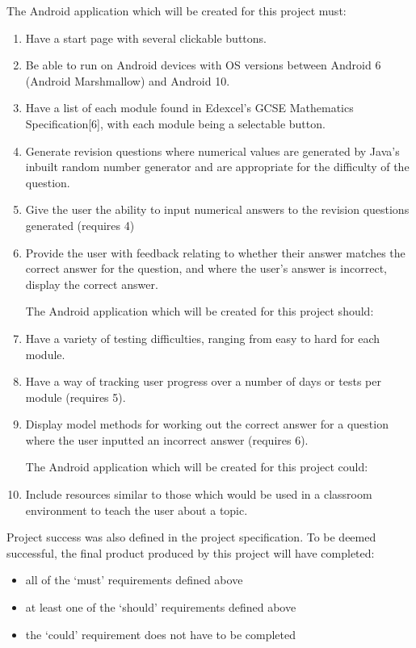 \documentclass{article}
\begin{document}
The Android application which will be created for this project must: 

\begin{enumerate}
	\item Have a start page with several clickable buttons.
	\item Be able to run on Android devices with OS versions between Android 6 (Android Marshmallow) and Android 10.
	\item Have a list of each module found in Edexcel's GCSE Mathematics Specification[6], with each module being a selectable button.
	\item Generate revision questions where numerical values are generated by Java's inbuilt random number generator and are appropriate for the difficulty of the question.
	\item Give the user the ability to input numerical answers to the revision questions generated (requires 4)
	\item Provide the user with feedback relating to whether their answer matches the correct answer for the question, and where the user’s answer is incorrect, display the correct answer. \par
	
	\hfill
	
	The Android application which will be created for this project should:
	\item Have a variety of testing difficulties, ranging from easy to hard for each module.
	\item Have a way of tracking user progress over a number of days or tests per module (requires 5).
	\item Display model methods for working out the correct answer for a question where the user inputted an incorrect answer (requires 6). \par
	
	\hfill
	
	The Android application which will be created for this project could:
	\item Include resources similar to those which would be used in a classroom environment to teach the user about a topic. \par
\end{enumerate}

Project success was also defined in the project specification. To be deemed successful, the final product produced by this project will have completed: 

\begin{itemize}
	\item all of the `must' requirements defined above
	\item at least one of the `should' requirements defined above
	\item the `could' requirement does not have to be completed
\end{itemize}
\end{document}
